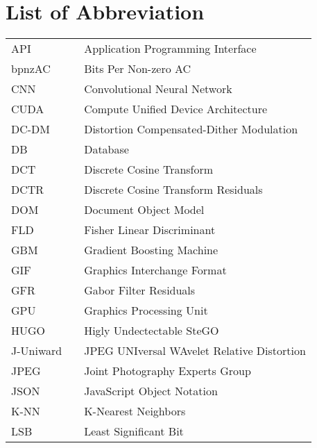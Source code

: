 
\titleformat{\chapter}[display]{\normalfont\huge\bfseries}{\chaptertitlename\ \thechapter}{20pt}{\Huge}
\chapter*{List of Abbreviation}
\normalsize{\begin{tabular}{l l l}
    API         && Application Programming Interface\\
    bpnzAC      && Bits Per Non-zero AC\\
    CNN         && Convolutional Neural Network\\
    CUDA        && Compute Unified Device Architecture\\
    DC-DM       && Distortion Compensated-Dither Modulation\\
    DB          && Database\\
    DCT         && Discrete Cosine Transform\\
    DCTR        && Discrete Cosine Transform Residuals\\
    DOM         && Document Object Model\\
    FLD         && Fisher Linear Discriminant\\
    GBM         && Gradient Boosting Machine\\
    GIF         && Graphics Interchange Format\\
    GFR         && Gabor Filter Residuals\\
    GPU         && Graphics Processing Unit\\
    HUGO        && Higly Undectectable SteGO\\
    J-Uniward   && JPEG UNIversal WAvelet Relative Distortion\\
    JPEG       & & Joint Photography Experts Group\\
    JSON        && JavaScript Object Notation\\
    K-NN        && K-Nearest Neighbors\\
    LSB         && Least Significant Bit\\

\end{tabular}}
